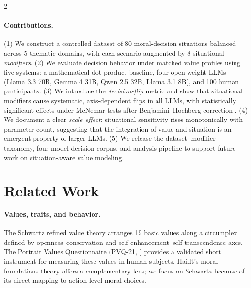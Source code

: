 \documentclass[11pt]{article}
\begin{document}
\begin{multicols}{2}
\paragraph{Contributions.} (1) We construct a controlled dataset of 80 moral-decision situations balanced across 5 thematic domains, with each scenario augmented by 8 situational \emph{modifiers}. (2) We evaluate decision behavior under matched value profiles using five systems: a mathematical dot-product baseline, four open-weight LLMs (Llama 3.3 70B, Gemma 4 31B, Qwen 2.5 32B, Llama 3.1 8B), and 100 human participants. (3) We introduce the \emph{decision-flip} metric and show that situational modifiers cause systematic, axis-dependent flips in all LLMs, with statistically significant effects under McNemar tests after Benjamini--Hochberg correction \citep{mcnemar1947note, benjamini1995controlling}. (4) We document a clear \emph{scale effect}: situational sensitivity rises monotonically with parameter count, suggesting that the integration of value and situation is an emergent property of larger LLMs. (5) We release the dataset, modifier taxonomy, four-model decision corpus, and analysis pipeline to support future work on situation-aware value modeling.

\section{Related Work}
\label{sec:related}

\paragraph{Values, traits, and behavior.} The Schwartz refined value theory \citep{schwartz2012refined} arranges 19 basic values along a circumplex defined by openness--conservation and self-enhancement--self-transcendence axes. The Portrait Values Questionnaire (PVQ-21, \citealp{schwartz2003proposal}) provides a validated short instrument for measuring these values in human subjects. Haidt's moral foundations theory \citep{haidt2012righteous} offers a complementary lens; we focus on Schwartz because of its direct mapping to action-level moral choices.


\end{multicols}
\end{document}
